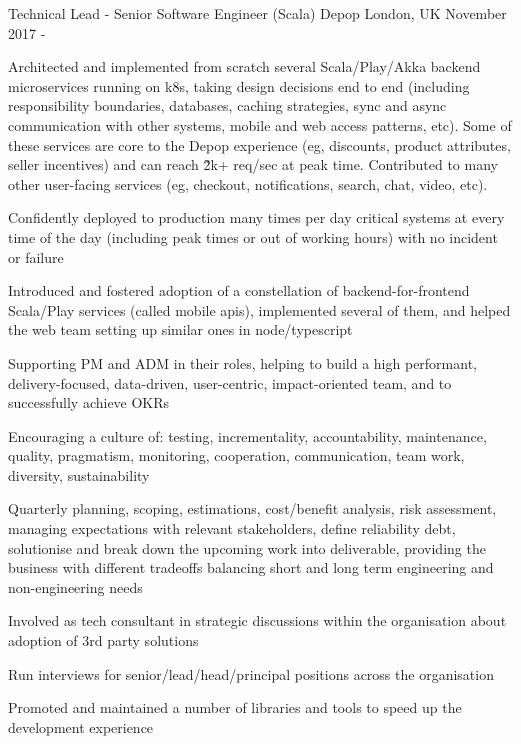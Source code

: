 \begin{cventries}
\cventry
  {Technical Lead - Senior Software Engineer (Scala)}
{Depop}
	{London, UK}
	{November 2017 - \present{}}
{%
\begin{cvitems} 
\item Architected and implemented from scratch several Scala/Play/Akka backend microservices running on k8s, taking design decisions end to end (including responsibility boundaries, databases, caching strategies, sync and async communication with other systems, mobile and web access patterns, etc). Some of these services are core to the Depop experience (eg, discounts, product attributes, seller incentives) and can reach \~ 2k+ req/sec at peak time. 
  Contributed to many other user-facing services (eg, checkout, notifications, search, chat, video, etc). 
\item Confidently deployed to production many times per day critical systems at every time of the day (including peak times or out of working hours) with no incident or failure 
  \item Introduced and fostered adoption of a constellation of backend-for-frontend Scala/Play services (called mobile apis), implemented several of them, and helped the web team setting up similar ones in node/typescript 
\item Supporting PM and ADM in their roles, helping to build a high performant, delivery-focused, data-driven, user-centric, impact-oriented team, and to successfully achieve OKRs 
  \item Encouraging a culture of: testing, incrementality, accountability, maintenance, quality, pragmatism, monitoring, cooperation, communication, team work, diversity, sustainability
\item Quarterly planning, scoping, estimations, cost/benefit analysis, risk assessment, managing expectations with relevant stakeholders, define reliability debt, solutionise and break down the upcoming work into deliverable, providing the business with different tradeoffs balancing short and long term engineering and non-engineering needs 
\item Involved as tech consultant in strategic discussions within the organisation about adoption of 3rd party solutions %
  \item Run interviews for senior/lead/head/principal positions across the organisation 
  \item Promoted and maintained a number of libraries and tools to speed up the development experience %

\end{cvitems}}
\end{cventries}
